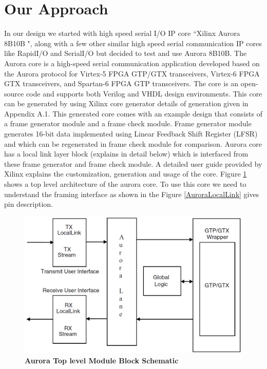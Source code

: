 \section{Our Approach}

In our design we started with high speed serial I/O IP core ``Xilinx Aurora 8B10B \cite{AuroraManual}", along with a few other similar high speed serial communication IP cores like RapidI/O and SerialI/O but decided to test and use Aurora 8B10B. The Aurora core is a high-speed serial communication application developed based on the Aurora protocol for Virtex-5 FPGA GTP/GTX transceivers, Virtex-6 FPGA GTX transceivers, and Spartan-6 FPGA GTP transceivers. The core is an open-source code and supports both Verilog and VHDL design environments. This core can be generated by using Xilinx core generator details of generation given in Appendix A.1. This generated core comes with an example design that consists of a frame generator module and a frame check module. Frame generator module generates 16-bit data implemented using Linear Feedback Shift Register (LFSR) and which can be regenerated in frame check module for comparison. Aurora core has a local link layer block (explains in detail below) which is interfaced from these frame generator and frame check module. A detailed user guide provided by Xilinx explains the customization, generation and usage of the core. Figure \ref{Auroratop} shows a top level architecture of the aurora core. To use this core we need to understand the framing interface as shown in the Figure \ref{AuroraLocalLink} gives pin description.\\
\begin{figure}[H]
  \centering
   \includegraphics[scale=0.8]{./figs/auroraTop}
  \caption{\textbf{Aurora Top level Module Block Schematic \cite{AuroraManual}}}
  \label{Auroratop}
\end{figure}

